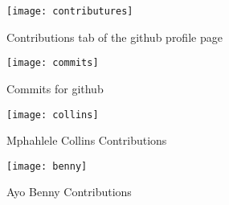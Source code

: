 \begin{figure}[H]
  \centering
    \texttt{[image: contributures]}
  \caption{Contributions tab of the github proﬁle page }
  \label{fig:contributions}
\end{figure}

\begin{figure}[H]
  \centering
    \texttt{[image: commits]}
  \caption{Commits for github}
  \label{fig:commits}
\end{figure}

\begin{figure}[H]
  \centering
    \texttt{[image: collins]}
  \caption{Mphahlele Collins Contributions}
  \label{fig:Contributionscollins}
\end{figure}

\begin{figure}[H]
  \centering
    \texttt{[image: benny]}
  \caption{Ayo Benny Contributions}
  \label{fig:Contributionsbenny}
\end{figure}